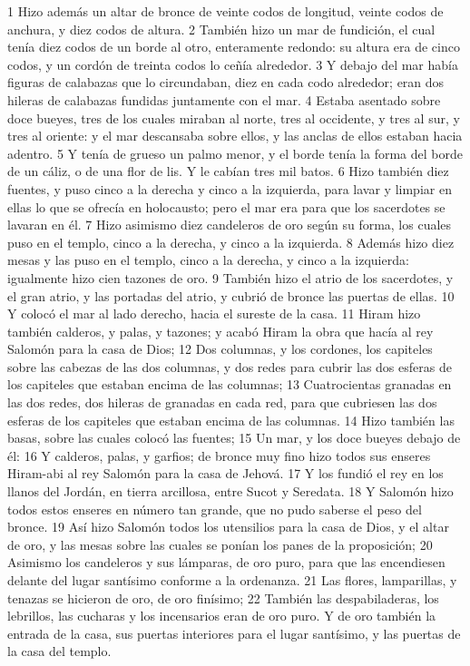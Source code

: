 1 Hizo además un altar de bronce de veinte codos   de longitud, veinte codos de anchura, y diez codos de altura.
2 También hizo un mar de fundición, el cual tenía diez codos   de un borde al otro, enteramente redondo: su altura era de cinco codos, y un cordón de treinta codos lo ceñía alrededor.
3 Y debajo del mar había figuras de calabazas que lo circundaban, diez en cada codo    alrededor; eran dos hileras de calabazas fundidas juntamente con el mar.
4 Estaba asentado sobre doce bueyes, tres de los cuales miraban al norte, tres al occidente, y tres al sur, y tres al oriente: y el mar descansaba sobre ellos, y las anclas de ellos estaban hacia adentro.
5 Y tenía de grueso un palmo menor,  y el borde tenía la forma del borde de un cáliz, o de una flor de lis. Y le cabían tres mil batos.
6 Hizo también diez fuentes, y puso cinco a la derecha y cinco a la izquierda, para lavar y limpiar en ellas lo que se ofrecía en holocausto; pero el mar era para que los sacerdotes se lavaran en él.
7 Hizo asimismo diez candeleros de oro según su forma, los cuales puso en el templo, cinco a la derecha, y cinco a la izquierda.
8 Además hizo diez mesas y las puso en el templo, cinco a la derecha, y cinco a la izquierda: igualmente hizo cien tazones de oro.
9 También hizo el atrio de los sacerdotes, y el gran atrio, y las portadas del atrio, y cubrió de bronce las puertas de ellas.
10 Y colocó el mar al lado derecho, hacia el sureste de la casa.
11 Hiram hizo también calderos, y palas, y tazones; y acabó Hiram la obra que hacía al rey Salomón para la casa de Dios;
12 Dos columnas, y los cordones, los capiteles sobre las cabezas de las dos columnas, y dos redes para cubrir las dos esferas de los capiteles que estaban encima de las columnas;
13 Cuatrocientas granadas en las dos redes, dos hileras de granadas en cada red, para que cubriesen las dos esferas de los capiteles que estaban encima de las columnas.
14 Hizo también las basas, sobre las cuales colocó las fuentes;
15 Un mar, y los doce bueyes debajo de él:
16  Y calderos, palas, y garfios; de bronce muy fino hizo todos sus enseres Hiram-abi al rey Salomón para la casa de Jehová.
17 Y los fundió el rey en los llanos del Jordán, en tierra arcillosa, entre Sucot y Seredata.
18 Y Salomón hizo todos estos enseres en número tan grande, que no pudo saberse el peso del bronce.
19 Así hizo Salomón todos los utensilios para la casa de Dios, y el altar de oro, y las mesas sobre las cuales se ponían los panes de la proposición;
20 Asimismo los candeleros y sus lámparas, de oro puro, para que las encendiesen delante del lugar santísimo conforme a la ordenanza.
21 Las flores, lamparillas, y tenazas se hicieron de oro, de oro finísimo;
22 También las despabiladeras, los lebrillos, las cucharas y los incensarios eran de oro puro. Y de oro también la entrada de la casa, sus puertas interiores para el lugar santísimo, y las puertas de la casa del templo.

